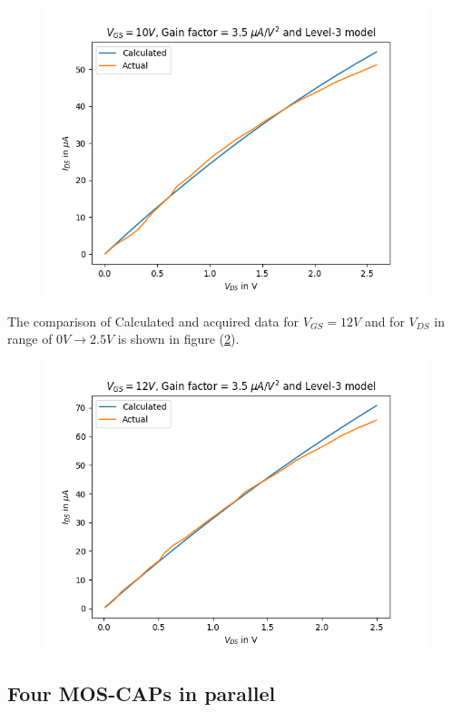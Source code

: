 \documentclass{article}
\begin{document}
\begin{figure}
    \label{fig:ids-comp-10-3.5}
    \includegraphics[scale=0.6]{../Images/Previous/Ids-comp-10-3.5.png}
\end{figure}
The comparison of Calculated and acquired data for $V_{GS} = 12 V$ and for  $V_{DS}$  in range of $0 V\to 2.5 V $ is shown in figure (\ref{fig:ids-comp-12-3.5}). 
\begin{figure}
    \label{fig:ids-comp-12-3.5}
    \includegraphics[scale=0.6]{../Images/Previous/Ids-comp-12-3.5.png}
\end{figure}

\newpage

\subsection*{Four MOS-CAPs in parallel}
\end{document}
